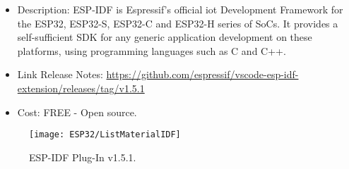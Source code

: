 \begin{itemize}
    \begin{itemize}
        \item Description: ESP-IDF is Espressif's official \ac{iot} Development Framework for the ESP32, ESP32-S, ESP32-C and ESP32-H series of SoCs. It provides a self-sufficient SDK for any generic application development on these platforms, using programming languages such as C and C++.
        \item Link Release Notes: \url{https://github.com/espressif/vscode-esp-idf-extension/releases/tag/v1.5.1}
        \item Cost: FREE - Open source.
    \end{itemize}
    \begin{figure}  
        \begin{center}
            \texttt{[image: ESP32/ListMaterialIDF]}
            \caption{ESP-IDF Plug-In v1.5.1.} 
            \label{fig:ESP-IDF Plug-In v1.5.1.}
        \end{center}
    \end{figure}
\end{itemize}




